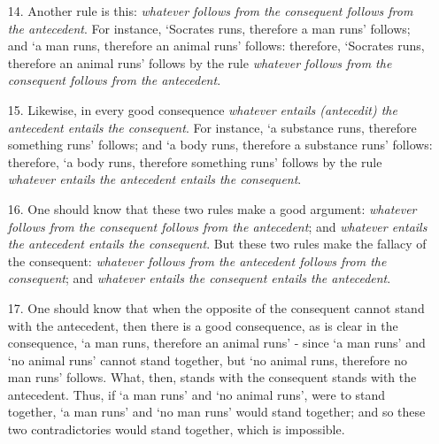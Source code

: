 \documentclass[]{article}
\begin{document}
\begin{enumerate}
\item[14.] Another rule is this: \textit{whatever follows from the consequent follows from the antecedent}. For instance, `Socrates runs, therefore a man runs' follows; and `a man runs, therefore an animal runs' follows: therefore, `Socrates runs, therefore an animal runs' follows by the rule \textit{whatever follows from the consequent follows from the antecedent}.
\item[15.] Likewise, in every good consequence \textit{whatever entails (antecedit) the antecedent entails the consequent}. For instance, `a substance runs, therefore something runs' follows; and `a body runs, therefore a substance runs' follows: therefore, `a body runs, therefore something runs' follows by the rule \textit{whatever entails the antecedent entails the consequent}.
\item[16.] One should know that these two rules make a good argument: \textit{whatever follows from the consequent follows from the antecedent}; and \textit{whatever entails the antecedent entails the consequent}. But these two rules make the fallacy of the consequent: \textit{whatever follows from the antecedent follows from the consequent}; and \textit{whatever entails the consequent entails the antecedent}.
\item[17.] One should know that when the opposite of the consequent cannot stand with the antecedent, then there is a good consequence, as is clear in the consequence, `a man runs, therefore an animal runs' - since `a man runs' and `no animal runs' cannot stand together, but `no animal runs, therefore no man runs' follows. What, then, stands with the consequent stands with the antecedent. Thus, if `a man runs' and `no animal runs', were to stand together, `a man runs' and `no man runs' would stand together; and so these two contradictories would stand together, which is impossible.

\end{enumerate}
\end{document}
